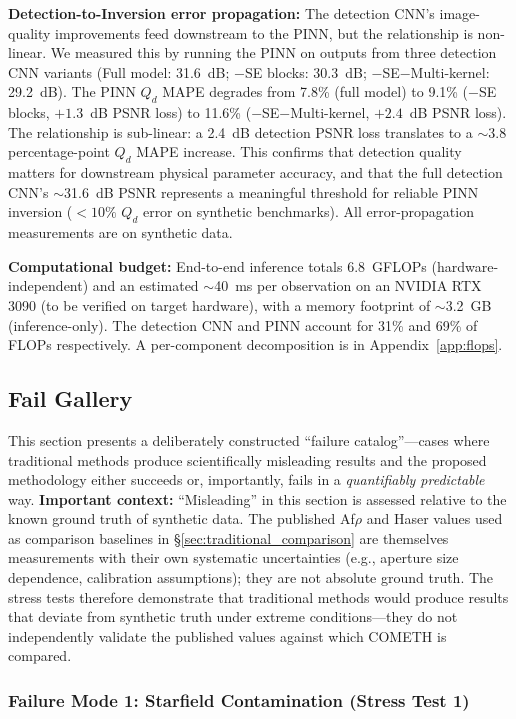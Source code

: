 \documentclass[usenatbib]{mnras}
\begin{document}
\textbf{Detection-to-Inversion error propagation:} The detection CNN's image-quality improvements feed downstream to the PINN, but the relationship is non-linear. We measured this by running the PINN on outputs from three detection CNN variants (Full model: 31.6~dB; $-$SE blocks: 30.3~dB; $-$SE$-$Multi-kernel: 29.2~dB). The PINN $Q_d$ MAPE degrades from 7.8\% (full model) to 9.1\% ($-$SE blocks, $+1.3$~dB PSNR loss) to 11.6\% ($-$SE$-$Multi-kernel, $+2.4$~dB PSNR loss). The relationship is sub-linear: a 2.4~dB detection PSNR loss translates to a $\sim$3.8 percentage-point $Q_d$ MAPE increase. This confirms that detection quality matters for downstream physical parameter accuracy, and that the full detection CNN's $\sim$31.6~dB PSNR represents a meaningful threshold for reliable PINN inversion ($<10\%$ $Q_d$ error on synthetic benchmarks). All error-propagation measurements are on synthetic data.

\textbf{Computational budget:} End-to-end inference totals 6.8~GFLOPs (hardware-independent) and an estimated $\sim$40~ms per observation on an NVIDIA RTX 3090 (to be verified on target hardware), with a memory footprint of $\sim$3.2~GB (inference-only). The detection CNN and PINN account for 31\% and 69\% of FLOPs respectively. A per-component decomposition is in Appendix~\ref{app:flops}.


\subsection{Fail Gallery}\label{sec:fail_gallery}

This section presents a deliberately constructed ``failure catalog''---cases where traditional methods produce scientifically misleading results and the proposed methodology either succeeds or, importantly, fails in a \textit{quantifiably predictable} way. \textbf{Important context:} ``Misleading'' in this section is assessed relative to the known ground truth of synthetic data. The published Af$\rho$ and Haser values used as comparison baselines in \S\ref{sec:traditional_comparison} are themselves measurements with their own systematic uncertainties (e.g., aperture size dependence, calibration assumptions); they are not absolute ground truth. The stress tests therefore demonstrate that traditional methods would produce results that deviate from synthetic truth under extreme conditions---they do not independently validate the published values against which COMETH is compared.

\subsubsection{Failure Mode 1: Starfield Contamination (Stress Test 1)}
\end{document}
